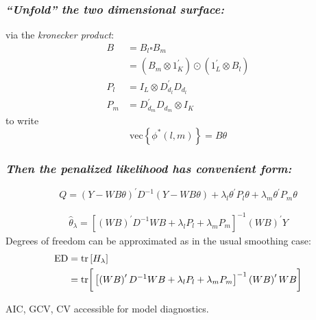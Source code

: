\documentclass[12pt]{beamer}
\newcommand{\ms}{\scriptscriptstyle}
\begin{document}
\begin{frame}
\frametitle{\emph{``Unfold'' the two dimensional surface:}}

via the \emph{kronecker product}:
\begin{align*} %
B &= B_l \square B_m \\
&= \left( B_m \otimes 1^\prime_{K} \right) \odot \left(1^\prime_{L} \otimes  B_l  \right)\\
P_l  &=  I_L \otimes D_{d_{\ms l}}^\prime D_{d_{\ms l}}\\
P_m &=   D_{d_{\ms m}}^\prime D_{d_{\ms m}} \otimes I_K
\end{align*}
to write
\begin{equation*}
\mbox{vec}\left\{ \phi^*\left(l,m\right)\right \} = B \theta
\end{equation*}

\end{frame}




\begin{frame}
\frametitle{\emph{Then the penalized likelihood has convenient form:}}

\begin{equation*} %
Q = \left( Y - WB\theta\right)^\prime D^{-1} \left( Y - WB\theta\right) + \lambda_l  \theta^\prime P_l \theta + \lambda_m \theta^\prime P_m \theta 
\end{equation*}


\begin{align*} \label{eq:tensor-pspline-normal-equations}
\hat{\theta}_\lambda = \left[ \left(WB\right)^\prime D^{-1}WB +  \lambda_l P_l+ \lambda_m P_m\right]^{-1} \left(W B\right)^\prime Y
\end{align*}
Degrees of freedom can be approximated as in the usual smoothing case:
\begin{align*}
\textup{ED} &= \textup{tr} \left[ H_\lambda \right]\\
&= \textup{tr}\bigg[\left[ \left(WB\right)^\prime D^{-1}WB +  \lambda_l P_l+ \lambda_m P_m\right]^{-1} \left(W B\right)^\prime WB  \bigg]
\end{align*}

AIC, GCV, CV accessible for model diagnostics.

\end{frame}



\end{document}
